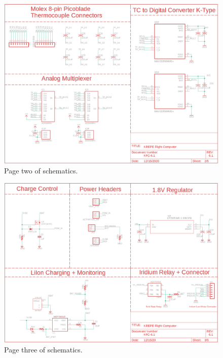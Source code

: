 \documentclass{article}
\begin{document}
\begin{figure}[H]
    \centering
    \includegraphics[width=\textwidth]{images/page2.png}
    \caption{Page two of schematics.}
    \label{fig:page1_1}
\end{figure}

\begin{figure}[H]
    \centering
    \includegraphics[width=\textwidth]{images/page3.png}
    \caption{Page three of schematics.}
    \label{fig:page1-3}
\end{figure}
\end{document}
